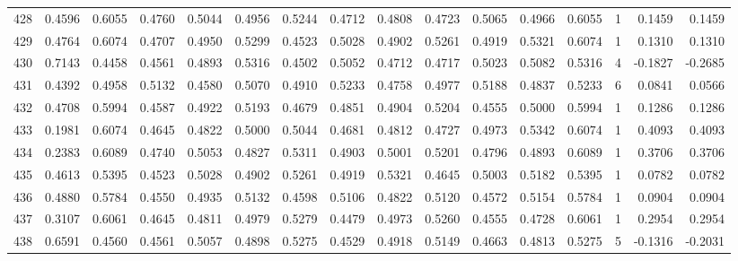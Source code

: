 \begin{tabular}{lrrrrrrrrrrrrrrr}
428 &      0.4596 &  0.6055 &  0.4760 &  0.5044 &  0.4956 &  0.5244 &  0.4712 &  0.4808 &  0.4723 &  0.5065 &   0.4966 &     0.6055 &      1 &                    0.1459 &                     0.1459 \\
429 &      0.4764 &  0.6074 &  0.4707 &  0.4950 &  0.5299 &  0.4523 &  0.5028 &  0.4902 &  0.5261 &  0.4919 &   0.5321 &     0.6074 &      1 &                    0.1310 &                     0.1310 \\
430 &      0.7143 &  0.4458 &  0.4561 &  0.4893 &  0.5316 &  0.4502 &  0.5052 &  0.4712 &  0.4717 &  0.5023 &   0.5082 &     0.5316 &      4 &                   -0.1827 &                    -0.2685 \\
431 &      0.4392 &  0.4958 &  0.5132 &  0.4580 &  0.5070 &  0.4910 &  0.5233 &  0.4758 &  0.4977 &  0.5188 &   0.4837 &     0.5233 &      6 &                    0.0841 &                     0.0566 \\
432 &      0.4708 &  0.5994 &  0.4587 &  0.4922 &  0.5193 &  0.4679 &  0.4851 &  0.4904 &  0.5204 &  0.4555 &   0.5000 &     0.5994 &      1 &                    0.1286 &                     0.1286 \\
433 &      0.1981 &  0.6074 &  0.4645 &  0.4822 &  0.5000 &  0.5044 &  0.4681 &  0.4812 &  0.4727 &  0.4973 &   0.5342 &     0.6074 &      1 &                    0.4093 &                     0.4093 \\
434 &      0.2383 &  0.6089 &  0.4740 &  0.5053 &  0.4827 &  0.5311 &  0.4903 &  0.5001 &  0.5201 &  0.4796 &   0.4893 &     0.6089 &      1 &                    0.3706 &                     0.3706 \\
435 &      0.4613 &  0.5395 &  0.4523 &  0.5028 &  0.4902 &  0.5261 &  0.4919 &  0.5321 &  0.4645 &  0.5003 &   0.5182 &     0.5395 &      1 &                    0.0782 &                     0.0782 \\
436 &      0.4880 &  0.5784 &  0.4550 &  0.4935 &  0.5132 &  0.4598 &  0.5106 &  0.4822 &  0.5120 &  0.4572 &   0.5154 &     0.5784 &      1 &                    0.0904 &                     0.0904 \\
437 &      0.3107 &  0.6061 &  0.4645 &  0.4811 &  0.4979 &  0.5279 &  0.4479 &  0.4973 &  0.5260 &  0.4555 &   0.4728 &     0.6061 &      1 &                    0.2954 &                     0.2954 \\
438 &      0.6591 &  0.4560 &  0.4561 &  0.5057 &  0.4898 &  0.5275 &  0.4529 &  0.4918 &  0.5149 &  0.4663 &   0.4813 &     0.5275 &      5 &                   -0.1316 &                    -0.2031 \\

\end{tabular}
